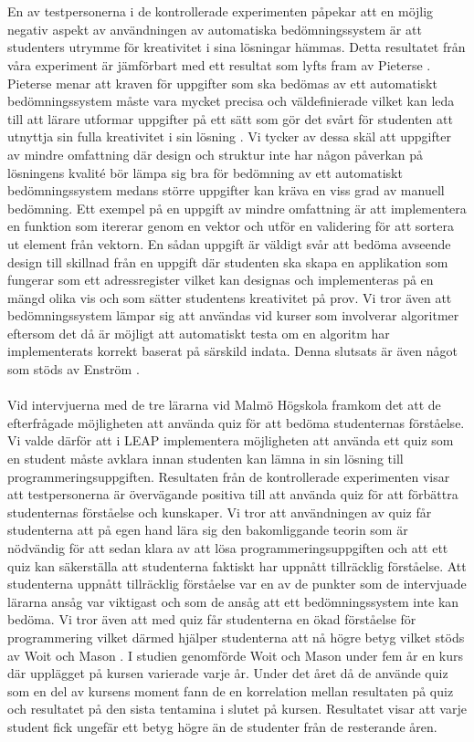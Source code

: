 \documentclass[a4paper,11pt]{article}
\begin{document}
{\\
\\
En av testpersonerna i de kontrollerade experimenten påpekar att en möjlig negativ aspekt av användningen av automatiska bedömningssystem är att studenters utrymme för kreativitet i sina lösningar hämmas. Detta resultatet från våra experiment är jämförbart med ett resultat som lyfts fram av Pieterse \cite{pieterse}. Pieterse menar att kraven för uppgifter som ska bedömas av ett automatiskt bedömningssystem måste vara mycket precisa och väldefinierade vilket kan leda till att lärare utformar uppgifter på ett sätt som gör det svårt för studenten att utnyttja sin fulla kreativitet i sin lösning \cite{pieterse}. Vi tycker av dessa skäl att uppgifter av mindre omfattning där design och struktur inte har någon påverkan på lösningens kvalité bör lämpa sig bra för bedömning av ett automatiskt bedömningssystem medans större uppgifter kan kräva en viss grad av manuell bedömning. Ett exempel på en uppgift av mindre omfattning är att implementera en funktion som itererar genom en vektor och utför en validering för att sortera ut element från vektorn. En sådan uppgift är väldigt svår att bedöma avseende design till skillnad från en uppgift där studenten ska skapa en applikation som fungerar som ett adressregister vilket kan designas och implementeras på en mängd olika vis och som sätter studentens kreativitet på prov. Vi tror även att bedömningssystem lämpar sig att användas vid kurser som involverar algoritmer eftersom det då är möjligt att automatiskt testa om en algoritm har implementerats korrekt baserat på särskild indata. Denna slutsats är även något som stöds av Enström \cite{enstrom}.
\\
\\
Vid intervjuerna med de tre lärarna vid Malmö Högskola framkom det att de efterfrågade möjligheten att använda quiz för att bedöma studenternas förståelse. Vi valde därför att i LEAP implementera möjligheten att använda ett quiz som en student måste avklara innan studenten kan lämna in sin lösning till programmeringsuppgiften. Resultaten från de kontrollerade experimenten visar att testpersonerna är övervägande positiva till att använda quiz för att förbättra studenternas förståelse och kunskaper. Vi tror att användningen av quiz får studenterna att på egen hand lära sig den bakomliggande teorin som är nödvändig för att sedan klara av att lösa programmeringsuppgiften och att ett quiz kan säkerställa att studenterna faktiskt har uppnått tillräcklig förståelse. Att studenterna uppnått tillräcklig förståelse var en av de punkter som de intervjuade lärarna ansåg var viktigast och som de ansåg att ett bedömningssystem inte kan bedöma. Vi tror även att med quiz får studenterna en ökad förståelse för programmering vilket därmed hjälper studenterna att nå högre betyg vilket stöds av Woit och Mason \cite{woit_2003}. I studien genomförde Woit och Mason under fem år en kurs där upplägget på kursen varierade varje år. Under det året då de använde quiz som en del av kursens moment fann de en korrelation mellan resultaten på quiz och resultatet på den sista tentamina i slutet på kursen. Resultatet visar att varje student fick ungefär ett betyg högre än de studenter från de resterande åren.
}
\end{document}
